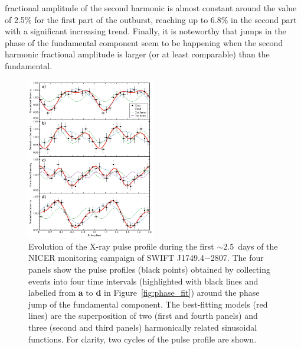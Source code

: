 \documentclass[fleqn,usenatbib]{mnras}
\newcommand{\swiftj}{SWIFT J1749.4$-$2807}
\newcommand{\nicer}{NICER}
\begin{document}
fractional amplitude of the second harmonic is almost constant around the value of 2.5\% for the first part of the outburst, reaching up to 6.8\% in the second part with a significant increasing trend. Finally, it is noteworthy that jumps in the phase of the fundamental component seem to be happening when the second harmonic fractional amplitude is larger (or at least comparable) than the fundamental.   


\begin{figure}
\centering
\includegraphics[width=0.5\textwidth]{best_profile}
\caption{Evolution of the X-ray pulse profile during the first $\sim 2.5$~days of the \nicer{} monitoring campaign of \swiftj{}. The four panels show the pulse profiles (black points) obtained by collecting events into four time intervals (highlighted with black lines and labelled from \textbf{a} to \textbf{d} in Figure~\ref{fig:phase_fit}) around the phase jump of the fundamental component. The best-fitting models (red lines) are the superposition of two (first and fourth panels) and three (second and third panels) harmonically related sinusoidal functions. For clarity, two cycles of the pulse profile are shown.}
\label{fig:profile_evo}
\end{figure} 
\end{document}
